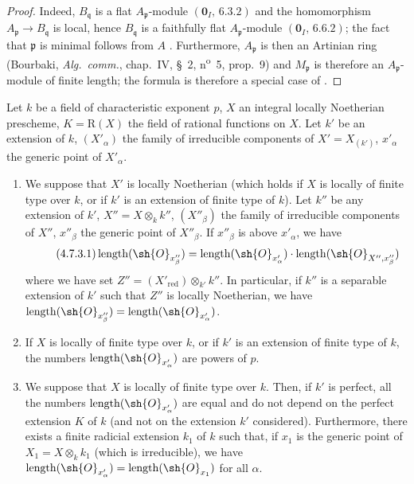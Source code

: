 \begin{proof}
Indeed, $B_\mathfrak{q}$ is a flat $A_\mathfrak{p}$-module $(\mathbf{0}_I,\,6.3.2)$ and the homomorphism $A_\mathfrak{p}\to B_\mathfrak{q}$ is local, hence $B_\mathfrak{q}$ is a faithfully flat $A_\mathfrak{p}$-module $(\mathbf{0}_I,\,6.6.2)$; the fact that $\mathfrak{p}$ is minimal follows from $A$ .
Furthermore, $A_\mathfrak{p}$ is then an Artinian ring (Bourbaki, \emph{Alg.\ comm.}, chap.~IV, \S~2, n\textsuperscript{o}~5, prop.~9) and $M_\mathfrak{p}$ is therefore an $A_\mathfrak{p}$-module of finite length; the formula  is therefore a special case of .
\end{proof}

\begin{proposition}[4.7.3]
\label{IV.4.7.3}
Let $k$ be a field of characteristic exponent $p$, $X$ an integral locally Noetherian prescheme, $K=\mathrm{R}(X)$ the field of rational functions on $X$.
Let $k'$ be an extension of $k$, $(X'_\alpha)$ the family of irreducible components of $X'=X_{(k')}$, $x'_\alpha$ the generic point of $X'_\alpha$.
\begin{enumerate}[label=(\roman*)]
  \item We suppose that $X'$ is locally Noetherian (which holds if $X$ is locally of finite type over $k$, or if $k'$ is an extension of finite type of $k$).
Let $k''$ be any extension of $k'$, $X''=X\otimes_k k''$, $(X''_\beta)$ the family of irreducible components of $X''$, $x''_\beta$ the generic point of $X''_\beta$.
If $x''_\beta$ is above $x'_\alpha$, we have
\[
\tag{4.7.3.1}
  \operatorname{length}(\sh{O}_{x''_\beta}) = \operatorname{length}(\sh{O}_{x'_\alpha})\cdot\operatorname{length}(\sh{O}_{X'',x''_\beta})
\]
where we have set $Z''=(X'_{\mathrm{red}})\otimes_{k'} k''$.
In particular, if $k''$ is a separable extension of $k'$ such that $Z''$ is locally Noetherian, we have $\operatorname{length}(\sh{O}_{x''_\beta}) = \operatorname{length}(\sh{O}_{x'_\alpha})$.
  \item If $X$ is locally of finite type over $k$, or if $k'$ is an extension of finite type of $k$, the numbers $\operatorname{length}(\sh{O}_{x'_\alpha})$ are powers of $p$.
  \item We suppose that $X$ is locally of finite type over $k$.
Then, if $k'$ is perfect, all the numbers $\operatorname{length}(\sh{O}_{x'_\alpha})$ are equal and do not depend on the perfect extension $K$ of $k$ (and not on the extension $k'$ considered).
Furthermore, there exists a finite radicial extension $k_1$ of $k$ such that, if $x_1$ is the generic point of $X_1=X\otimes_k k_1$ (which is irreducible), we have $\operatorname{length}(\sh{O}_{x'_\alpha}) = \operatorname{length}(\sh{O}_{x_1})$ for all $\alpha$.
\end{enumerate}
\end{proposition}

